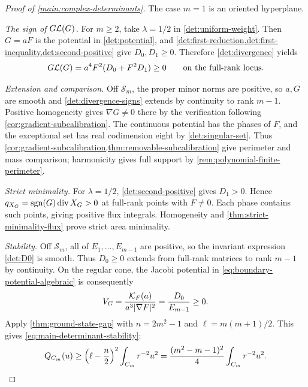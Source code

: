 \begin{proof}[Proof of \cref{main:complex-determinants}]
The case $m=1$ is an oriented hyperplane.

\emph{The sign of $G\mathcal L(G)$.}  For $m\geq2$, take
$\lambda=1/2$ in \eqref{det:uniform-weight}.  Then
$G=aF$ is the potential in \eqref{det:potential}, and
\cref{det:first-reduction,det:first-inequality,det:second-positive}
give $D_0,D_1\geq0$.  Therefore \eqref{det:divergence} yields
\begin{equation}\label{det:divergence-signs}
 G\mathcal L(G)=a^4F^2(D_0+F^2D_1)\geq0
 \qquad\text{on the full-rank locus}.
\end{equation}

\emph{Extension and comparison.}
Off $\mathcal S_m$, the proper minor norms are positive, so $a,G$
are smooth and \eqref{det:divergence-signs} extends by continuity to
rank $m-1$. Positive homogeneity gives $\nabla G\ne0$ there by the
verification following \cref{cor:gradient-subcalibration}.
The continuous potential has the phases of $F$, and the exceptional
set has real codimension eight by \eqref{det:singular-set}.
Thus \cref{cor:gradient-subcalibration,thm:removable-subcalibration}
give perimeter and mass comparison; harmonicity gives full support
by \cref{rem:polynomial-finite-perimeter}.

\emph{Strict minimality.}  For $\lambda=1/2$, \cref{det:second-positive} gives $D_1>0$.
Hence $q_{X_G}=\operatorname{sgn}(G)\operatorname{div} X_G>0$ at full-rank points
with $F\ne0$. Each phase contains such points, giving positive flux
integrals. Homogeneity and \cref{thm:strict-minimality-flux} prove
strict area minimality.

\emph{Stability.} Off \(\mathcal S_m\), all of
\(E_1,\ldots,E_{m-1}\) are positive, so the invariant expression
\eqref{det:D0} is smooth.
Thus \(D_0\geq0\) extends from full-rank matrices to rank \(m-1\)
by continuity. On the regular cone, the Jacobi potential in
\eqref{eq:boundary-potential-algebraic} is consequently
\[
 V_G=\frac{\mathcal K_F(a)}{a^3|\nabla F|^2}=\frac{D_0}{E_{m-1}}\geq0.
\]
Apply \cref{thm:ground-state-gap} with
$n=2m^2-1$ and $\ell=m(m+1)/2$. This gives
\eqref{eq:main-determinant-stability}:
\[
 Q_{C_m}(u)\geq
 \left(\ell-\frac n2\right)^2\int_{C_m}r^{-2}u^2
 =\frac{(m^2-m-1)^2}{4}\int_{C_m}r^{-2}u^2.\qedhere
\]
\end{proof}

